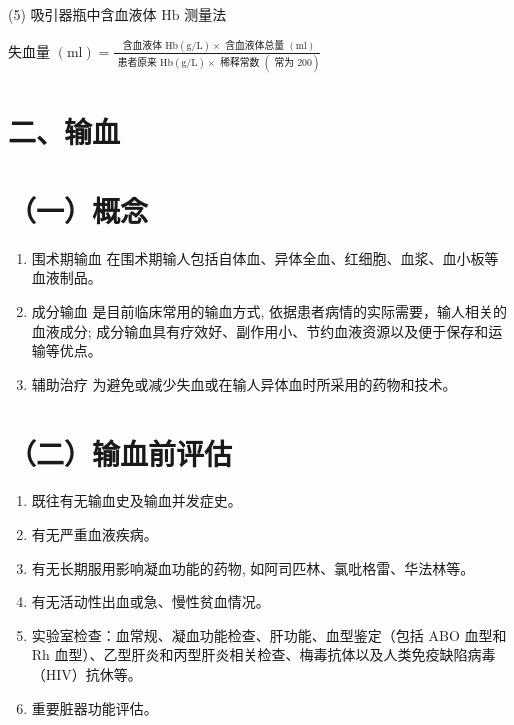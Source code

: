 \documentclass[10pt]{article}
\begin{document}
(5) 吸引器瓶中含血液体 $\mathrm{Hb}$ 测量法

失血量 $(\mathrm{ml})=\frac{\text { 含血液体 } \mathrm{Hb}(\mathrm{g} / \mathrm{L}) \times \text { 含血液体总量 }(\mathrm{ml})}{\text { 患者原来 } \mathrm{Hb}(\mathrm{g} / \mathrm{L}) \times \text { 稀释常数 }(\text { 常为 } 200)}$

\section*{二、输血}
\section*{（一）概念}
\begin{enumerate}
  \item 围术期输血 在围术期输人包括自体血、异体全血、红细胞、血浆、血小板等血液制品。

  \item 成分输血 是目前临床常用的输血方式, 依据患者病情的实际需要，输人相关的血液成分; 成分输血具有疗效好、副作用小、节约血液资源以及便于保存和运输等优点。

  \item 辅助治疗 为避免或减少失血或在输人异体血时所采用的药物和技术。

\end{enumerate}

\section*{（二）输血前评估}
\begin{enumerate}
  \item 既往有无输血史及输血并发症史。

  \item 有无严重血液疾病。

  \item 有无长期服用影响凝血功能的药物, 如阿司匹林、氯吡格雷、华法林等。

  \item 有无活动性出血或急、慢性贫血情况。

  \item 实验室检查：血常规、凝血功能检查、肝功能、血型鉴定（包括 $\mathrm{ABO}$ 血型和 Rh 血型）、乙型肝炎和丙型肝炎相关检查、梅毒抗体以及人类免疫缺陷病毒（HIV）抗休等。

  \item 重要脏器功能评估。

\end{enumerate}
\end{document}
